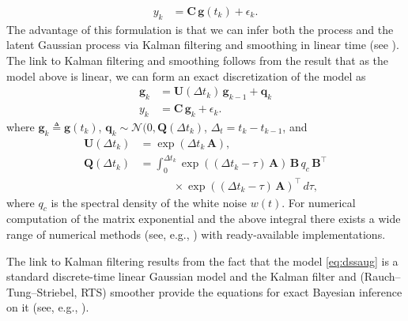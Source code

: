 \documentclass[journal]{IEEEtran}
\begin{document}
%
\begin{equation}
\begin{split}
  y_k &= \mathbf{C} \, \mathbf{g}(t_k) + \epsilon_k.
\end{split}
\label{eq:ssaugkf}
\end{equation}
%
The advantage of this formulation is that we can infer both the process and the latent Gaussian process via Kalman filtering and smoothing in linear time (see \cite{Hartikainen+Sarkka:2010,Sarkka+Solin+Hartikainen:2013}). The link to Kalman filtering and smoothing follows from the result that as the model above is linear, we can form an exact discretization of the model as
%
\begin{equation}
\begin{split}
  \mathbf{g}_k
  &= \mathbf{U}(\Delta t_k) \, \mathbf{g}_{k-1}
  + \mathbf{q}_k \\
  y_k &= \mathbf{C} \, \mathbf{g}_k + \epsilon_k.
\end{split}
\label{eq:dssaug}
\end{equation}
%
where $\mathbf{g}_k \triangleq \mathbf{g}(t_k)$, $\mathbf{q}_k \sim \mathcal{N}(0,\mathbf{Q}(\Delta t_k)$, $\Delta_t = t_k - t_{k-1}$, and
%
\begin{equation}
\begin{split}
  \mathbf{U}(\Delta t_k)  &= \exp(\Delta t_k \, \mathbf{A}), \\
  \mathbf{Q}(\Delta t_k) &= \int_0^{\Delta t_k} \exp((\Delta t_k - \tau) \, \mathbf{A}) \,
  \mathbf{B} \, q_c  \, \mathbf{B}^{\top} \\
  &\qquad \quad \times \exp((\Delta t_k - \tau) \, \mathbf{A})^{\top} \, d\tau,
\end{split}
\label{eq:dssaug}
\end{equation}
%
where $q_c$ is the spectral density of the white noise $w(t)$. For numerical computation of the matrix exponential and the above integral there exists a wide range of numerical methods (see, e.g., \cite{Grewal+Andrews:2001,Sarkka:2006}) with ready-available implementations.

The link to Kalman filtering results from the fact that the model \eqref{eq:dssaug} is a standard discrete-time linear Gaussian model and the Kalman filter and (Rauch--Tung--Striebel, RTS) smoother provide the equations for exact Bayesian inference on it (see, e.g., \cite{Sarkka:2013}). 
\end{document}
